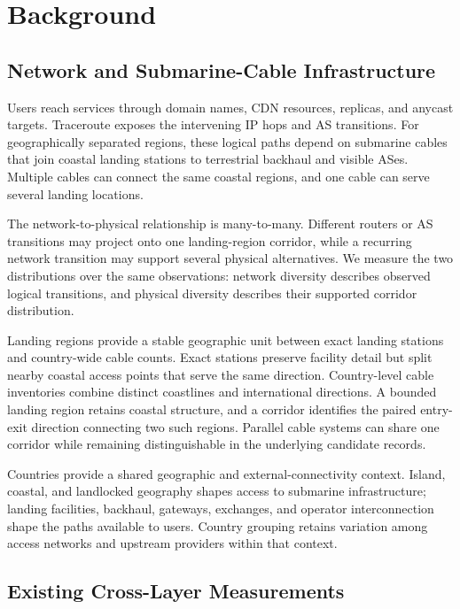 \section{Background}
\label{sec:background}

\subsection{Network and Submarine-Cable Infrastructure}
\label{sec:background_cross_layer}

Users reach services through domain names, CDN resources, replicas, and anycast
targets. Traceroute exposes the intervening IP hops and AS transitions. For
geographically separated regions, these logical paths depend on submarine
cables that join coastal landing stations to terrestrial backhaul and visible
ASes. Multiple cables can connect the same coastal regions, and one cable can
serve several landing locations.

The network-to-physical relationship is many-to-many. Different routers or AS
transitions may project onto one landing-region corridor, while a recurring
network transition may support several physical alternatives. We measure the
two distributions over the same observations: network diversity describes
observed logical transitions, and physical diversity describes their supported
corridor distribution.

Landing regions provide a stable geographic unit between exact landing
stations and country-wide cable counts. Exact stations preserve facility
detail but split nearby coastal access points that serve the same direction.
Country-level cable inventories combine distinct coastlines and international
directions. A bounded landing region retains coastal structure, and a corridor
identifies the paired entry-exit direction connecting two such regions.
Parallel cable systems can share one corridor while remaining distinguishable
in the underlying candidate records.

Countries provide a shared geographic and external-connectivity context.
Island, coastal, and landlocked geography shapes access to submarine
infrastructure; landing facilities, backhaul, gateways, exchanges, and operator
interconnection shape the paths available to users. Country grouping retains
variation among access networks and upstream providers within that context.

\subsection{Existing Cross-Layer Measurements}
\label{sec:background_existing_work}

